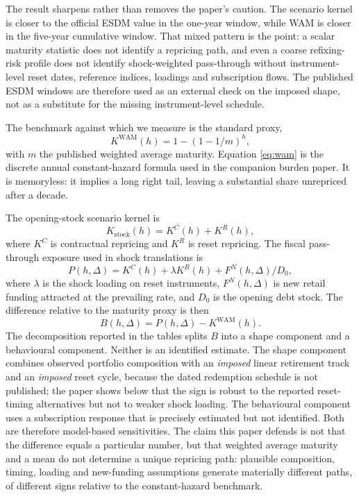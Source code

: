 \documentclass[11pt,a4paper]{article}
\begin{document}


The result sharpens rather than removes the paper's caution. The scenario
kernel is closer to the official ESDM value in the one-year window, while WAM
is closer in the five-year cumulative window. That mixed pattern is the point:
a scalar maturity statistic does not identify a repricing path, and even a
coarse refixing-risk profile does not identify shock-weighted pass-through
without instrument-level reset dates, reference indices, loadings and
subscription flows. The published ESDM windows are therefore used as an
external check on the imposed shape, not as a substitute for the missing
instrument-level schedule.

The benchmark against which we measure is the standard proxy,
\begin{equation}
  K^{\mathrm{WAM}}(h) = 1 - (1 - 1/m)^h,
  \label{eq:wam}
\end{equation}
with $m$ the published weighted average maturity. Equation \eqref{eq:wam} is
the discrete annual constant-hazard formula used in the companion burden paper.
It is memoryless: it implies a long right tail, leaving a substantial share
unrepriced after a decade.

The opening-stock scenario kernel is
\begin{equation}
  K_{\mathrm{stock}}(h)
  =
  K^{C}(h)
  + K^{R}(h),
  \label{eq:kernel}
\end{equation}
where $K^{C}$ is contractual repricing and $K^{R}$ is reset repricing. The
fiscal pass-through exposure used in shock translations is
\begin{equation}
  P(h,\Delta)
  =
  K^{C}(h)
  + \lambda K^{R}(h)
  + F^{N}(h,\Delta)/D_{0},
  \label{eq:pass-through}
\end{equation}
where $\lambda$ is the shock loading on reset instruments,
$F^{N}(h,\Delta)$ is new retail funding attracted at the prevailing rate, and
$D_{0}$ is the opening debt stock. The difference relative to the maturity
proxy is then
\begin{equation}
  B(h,\Delta) = P(h,\Delta) - K^{\mathrm{WAM}}(h).
  \label{eq:bias}
\end{equation}
The decomposition reported in the tables splits $B$ into a shape component and
a behavioural component. Neither is an identified estimate. The shape component
combines observed portfolio composition with an \emph{imposed} linear
retirement track and an \emph{imposed} reset cycle, because the dated
redemption schedule is not published; the paper shows below that the sign is
robust to the reported reset-timing alternatives but not to weaker shock
loading. The behavioural component uses a subscription response that is
precisely estimated but not identified. Both are therefore model-based
sensitivities. The claim this paper defends is not that the difference equals a
particular number, but that weighted average maturity and a mean do not
determine a unique repricing path: plausible composition, timing, loading and
new-funding assumptions generate materially different paths, of different
signs relative to the constant-hazard benchmark.
\end{document}
